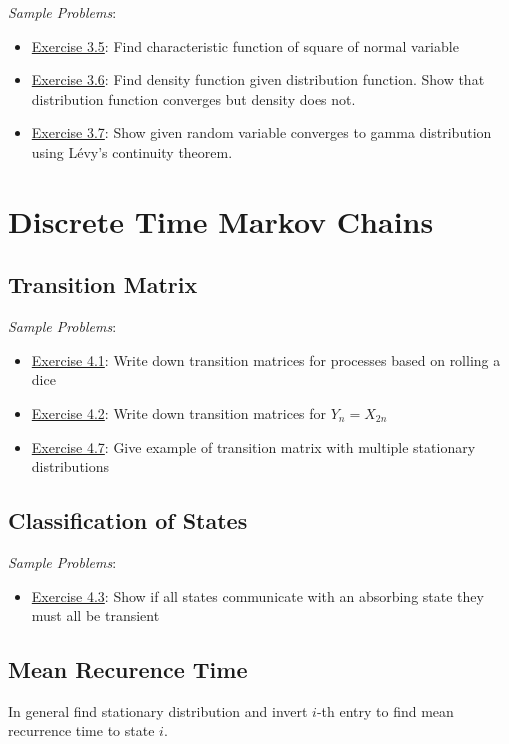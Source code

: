 \documentclass[12pt]{article}
\begin{document}
\textit{Sample Problems}:
\begin{itemize}[nolistsep]
    \item \hyperref[Exercise 3.5]{Exercise 3.5}: Find characteristic function of square of normal variable
    \item \hyperref[Exercise 3.6]{Exercise 3.6}: Find density function given distribution function. Show that distribution function converges but density does not.
    \item \hyperref[Exercise 3.7]{Exercise 3.7}: Show given random variable converges to gamma distribution using L\'evy's continuity theorem.
\end{itemize}



\pagebreak
\section{Discrete Time Markov Chains}
\subsection{Transition Matrix}
\textit{Sample Problems}: 
\begin{itemize}[nolistsep]
    \item \hyperref[Exercise 4.1]{Exercise 4.1}: Write down transition matrices for processes based on rolling a dice
    \item \hyperref[Exercise 4.2]{Exercise 4.2}: Write down transition matrices for \( Y_n = X_{2n} \)
    \item \hyperref[Exercise 4.7]{Exercise 4.7}: Give example of transition matrix with multiple stationary distributions
\end{itemize}

\subsection{Classification of States}


\textit{Sample Problems}: 
\begin{itemize}[nolistsep]
    \item \hyperref[Exercise 4.3]{Exercise 4.3}: Show if all states communicate with an absorbing state they must all be transient
\end{itemize}

\subsection{Mean Recurence Time}
In general find stationary distribution and invert \( i \)-th entry to find mean recurrence time to state \( i \).
\end{document}

